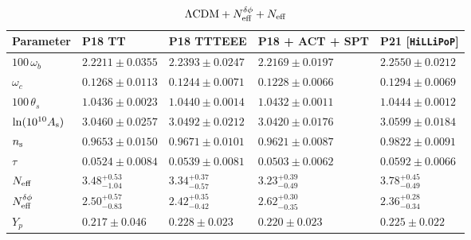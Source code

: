 \begin{subappendices}
\begin{table}
\begin{subtable}{\textwidth}
		\caption{$\Lambda\mathrm{CDM} + N_\mathrm{eff}^{\delta\phi} + N_\mathrm{eff}$}
\end{subtable}\\[4pt]
	\begin{subtable}{\textwidth}
		\centering

		
		\begin{tabular}{l l l l l}
				\toprule
			Parameter			& P18 TT					& P18 TTTEEE				& P18 + ACT + SPT			& P21 [\texttt{HiLLiPoP}]	\\
				\midrule[0.065em]
			$100\,\omega_b$		& $2.2211 \pm 0.0355$		& $2.2393 \pm 0.0247$		& $2.2169 \pm 0.0197$		& $2.2550 \pm 0.0212$		\\
			$\omega_c$			& $0.1268 \pm 0.0113$		& $0.1244 \pm 0.0071$		& $0.1228 \pm 0.0066$		& $0.1294 \pm 0.0069$		\\
			$100\,\theta_s$		& $1.0436 \pm 0.0023$		& $1.0440 \pm 0.0014$		& $1.0432 \pm 0.0011$		& $1.0444 \pm 0.0012$		\\
			$\ln(10^{10}A_\mathrm{s})$	& $3.0460 \pm 0.0257$		& $3.0492 \pm 0.0212$		& $3.0420 \pm 0.0176$		& $3.0599 \pm 0.0184$		\\
			$n_\mathrm{s}$				& $0.9653 \pm 0.0150$		& $0.9671 \pm 0.0101$		& $0.9621 \pm 0.0087$		& $0.9822 \pm 0.0091$		\\
			$\tau$				& $0.0524 \pm 0.0084$		& $0.0539 \pm 0.0081$		& $0.0503 \pm 0.0062$		& $0.0592 \pm 0.0066$		\\
			$N_\mathrm{eff}$				& $3.48^{+0.53}_{-1.04}$	& $3.34^{+0.37}_{-0.57}$	& $3.23^{+0.39}_{-0.49}$	& $3.78^{+0.45}_{-0.49}$	\\
			$N_\mathrm{eff}^{\delta\phi}$			& $2.50^{+0.57}_{-0.83}$	& $2.42^{+0.35}_{-0.42}$	& $2.62^{+0.30}_{-0.35}$	& $2.36^{+0.28}_{-0.34}$	\\
			$Y_p$				& $0.217 \pm 0.046$			& $0.228 \pm 0.023$			& $0.220 \pm 0.023$			& $0.225\pm 0.022$			\\
				\bottomrule
		\end{tabular}
	

\end{subtable}
\end{table}
\end{subappendices}
